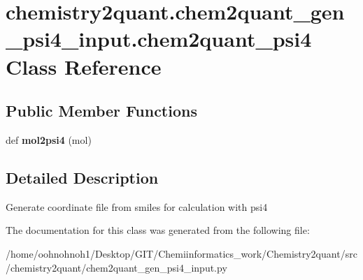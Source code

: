 \hypertarget{classchemistry2quant_1_1chem2quant__gen__psi4__input_1_1chem2quant__psi4}{}\section{chemistry2quant.\+chem2quant\+\_\+gen\+\_\+psi4\+\_\+input.\+chem2quant\+\_\+psi4 Class Reference}
\label{classchemistry2quant_1_1chem2quant__gen__psi4__input_1_1chem2quant__psi4}
\subsection*{Public Member Functions}
\begin{DoxyCompactItemize}
\item 
\mbox{\label{classchemistry2quant_1_1chem2quant__gen__psi4__input_1_1chem2quant__psi4_a4f4edda32b6b38dc42328e220327aed2}} 
def {\bfseries mol2psi4} (mol)
\end{DoxyCompactItemize}


\subsection{Detailed Description}
\begin{DoxyVerb}Generate coordinate file from smiles for calculation with 
psi4
\end{DoxyVerb}
 

The documentation for this class was generated from the following file\+:\begin{DoxyCompactItemize}
\item 
/home/oohnohnoh1/\+Desktop/\+G\+I\+T/\+Chemiinformatics\+\_\+work/\+Chemistry2quant/src/chemistry2quant/chem2quant\+\_\+gen\+\_\+psi4\+\_\+input.\+py\end{DoxyCompactItemize}
